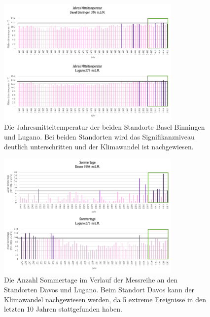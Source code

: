 \begin{refsection}
\begin{figure}
\centering
\includegraphics[width=0.8\textwidth]{extrem/JahresMittel.pdf}
\caption{Die Jahresmitteltemperatur der beiden Standorte Basel Binningen und Lugano. Bei beiden Standorten wird das Signifikanzniveau deutlich unterschritten und der Klimawandel ist nachgewiesen.}
\label{JMittel}
\end{figure}


\begin{figure}
\centering
\includegraphics[width=0.8\textwidth]{extrem/Sommertage.pdf}
\caption{Die Anzahl Sommertage im Verlauf der Messreihe an den Standorten Davos und Lugano. Beim Standort Davos kann der Klimawandel nachgewiesen werden, da 5 extreme Ereignisse in den letzten 10 Jahren stattgefunden haben.}
\label{Sommertage}
\end{figure}



\end{refsection}
